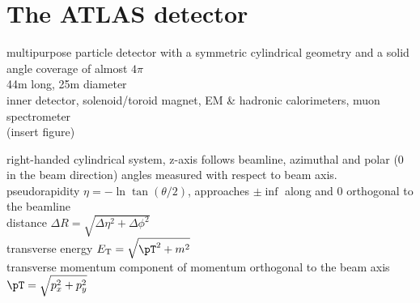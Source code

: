 \documentclass[../thesis.tex]{subfiles}
\begin{document}
\section{The ATLAS detector}
\label{sec:ATLAS}
multipurpose particle detector with a symmetric cylindrical geometry and a solid angle coverage of almost $4\pi$\\
44m long, 25m diameter\\
inner detector, solenoid/toroid magnet, EM \& hadronic calorimeters, muon spectrometer\\
(insert figure)


right-handed cylindrical system, z-axis follows beamline, azimuthal and polar (0 in the beam direction) angles measured with respect to beam axis.\\
pseudorapidity $\eta = -\ln \tan (\theta/2)$, approaches $\pm\inf$ along and 0 orthogonal to the beamline\\
distance $\Delta R=\sqrt{\Delta \eta^2 + \Delta \phi^2}$\\
transverse energy $E_\text{T}=\sqrt{\pT ^2+m^2}$\\
transverse momentum \pT component of momentum orthogonal to the beam axis $\pT = \sqrt{p_x^2 + p_y^2}$
\end{document}

